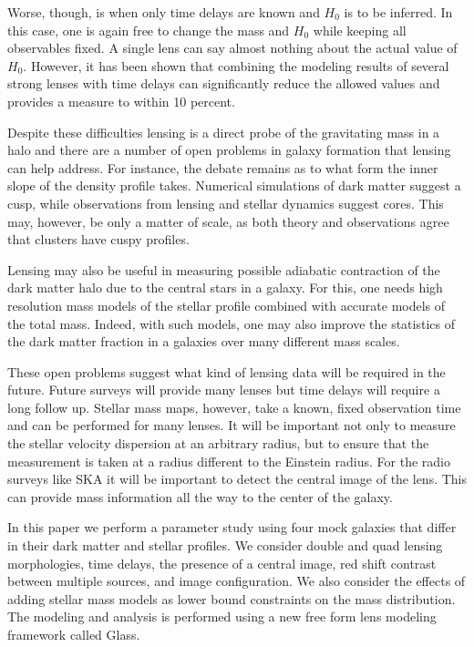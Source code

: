 \documentclass[onecolumn,galley]{mn2e}
\newcommand{\Glass}{{\sc Glass}}
\begin{document}
Worse, though, is when only time delays are known and $H_0$ is to be inferred.
In this case, one is again free to change the mass and $H_0$ while keeping
all observables fixed. A single lens can say almost nothing about the actual
value of $H_0$. However, it has been shown that combining the modeling results
of several strong lenses with time delays can significantly reduce the allowed
values and provides a measure to within 10 percent.

Despite these difficulties lensing is a direct probe of the gravitating
mass in a halo and there are a number of open problems in galaxy formation
that lensing can help address. For instance, the debate remains as to what
form the inner slope of the density profile takes. Numerical simulations of
dark matter suggest a cusp, while observations from lensing and stellar dynamics
suggest cores. This may, however, be only a matter of scale, as both theory
and observations agree that clusters have cuspy profiles. 

Lensing may also be useful in measuring possible adiabatic contraction of the 
dark matter halo due to the central stars in a galaxy. For this, one needs
high resolution mass models of the stellar profile combined with accurate models
of the total mass. Indeed, with such models, one may also improve the statistics
of the dark matter fraction in a galaxies over many different mass scales.

These open problems suggest what kind of lensing data will be required in the
future.  Future surveys will provide many lenses but time delays will require a
long follow up. Stellar mass maps, however, take a known, fixed observation
time and can be performed for many lenses. It will be important not only to
measure the stellar velocity dispersion at an arbitrary radius, but to ensure
that the measurement is taken at a radius different to the Einstein radius.
For the radio surveys like SKA it will be important to detect the central image
of the lens. This can provide mass information all the way to the center of the
galaxy.

In this paper we perform a parameter study using four mock galaxies that differ
in their dark matter and stellar profiles. We consider double and quad lensing
morphologies, time delays, the presence of a central image, red shift contrast
between multiple sources, and image configuration.  We also consider the
effects of adding stellar mass models as lower bound constraints on the mass
distribution.  The modeling and analysis is performed using a new free form
lens modeling framework called \Glass. 
\end{document}
